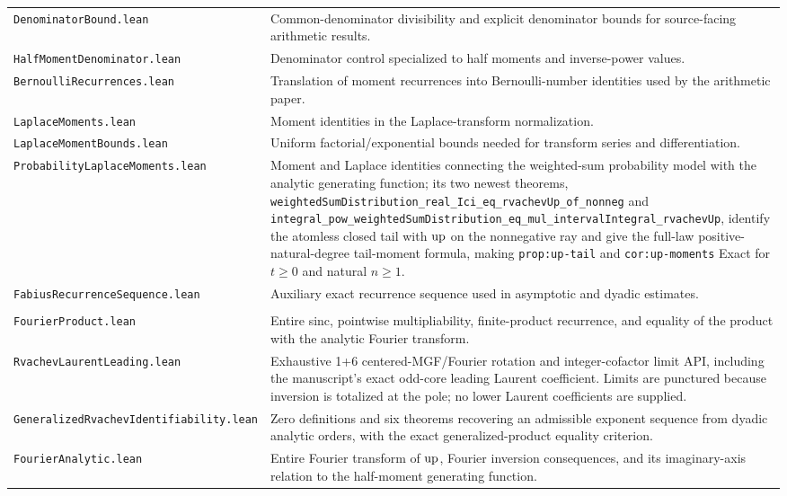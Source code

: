 \documentclass[11pt,oneside]{article}
\theoremstyle{definition}
\theoremstyle{remark}
\begin{document}
\begin{longtable}{>{\raggedright\arraybackslash}p{} >{\raggedright\arraybackslash}p{}}
\nolinkurl{DenominatorBound.lean} & Common-denominator divisibility and explicit denominator bounds for source-facing arithmetic results. \\
\nolinkurl{HalfMomentDenominator.lean} & Denominator control specialized to half moments and inverse-power values. \\
\nolinkurl{BernoulliRecurrences.lean} & Translation of moment recurrences into Bernoulli-number identities used by the arithmetic paper. \\
\nolinkurl{LaplaceMoments.lean} & Moment identities in the Laplace-transform normalization. \\
\nolinkurl{LaplaceMomentBounds.lean} & Uniform factorial/exponential bounds needed for transform series and differentiation. \\
\nolinkurl{ProbabilityLaplaceMoments.lean} & Moment and Laplace identities connecting the weighted-sum probability model with the analytic generating function; its two newest theorems, \nolinkurl{weightedSumDistribution_real_Ici_eq_rvachevUp_of_nonneg} and \nolinkurl{integral_pow_weightedSumDistribution_eq_mul_intervalIntegral_rvachevUp}, identify the atomless closed tail with \(\operatorname{up}\) on the nonnegative ray and give the full-law positive-natural-degree tail-moment formula, making \nolinkurl{prop:up-tail} and \nolinkurl{cor:up-moments} Exact for \(t\geq0\) and natural \(n\geq1\). \\
\nolinkurl{FabiusRecurrenceSequence.lean} & Auxiliary exact recurrence sequence used in asymptotic and dyadic estimates. \\
\addlinespace[0.45em]
\multicolumn{2}{l}{\textbf{Fourier, probability, and the first paper}}\\[0.25em]
\nolinkurl{FourierProduct.lean} & Entire sinc, pointwise multipliability, finite-product recurrence, and equality of the product with the analytic Fourier transform. \\
\nolinkurl{RvachevLaurentLeading.lean} & Exhaustive 1+6 centered-MGF/Fourier rotation and integer-cofactor limit API, including the manuscript's exact odd-core leading Laurent coefficient.  Limits are punctured because inversion is totalized at the pole; no lower Laurent coefficients are supplied. \\
\nolinkurl{GeneralizedRvachevIdentifiability.lean} & Zero definitions and six theorems recovering an admissible exponent sequence from dyadic analytic orders, with the exact generalized-product equality criterion. \\
\nolinkurl{FourierAnalytic.lean} & Entire Fourier transform of \(\operatorname{up}\), Fourier inversion consequences, and its imaginary-axis relation to the half-moment generating function. \\

\end{longtable}
\end{document}
